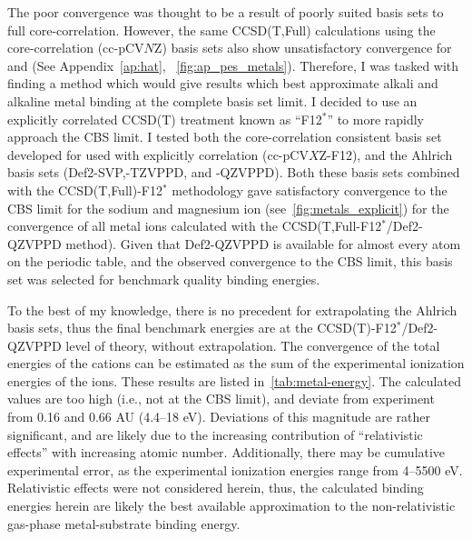 The poor convergence was thought to be a result of poorly suited basis sets to
full core-correlation. However, the same CCSD(T,Full) calculations using the
core-correlation (cc-pCV$N$Z) basis sets also show unsatisfactory convergence
for  and  (See Appendix~\ref{ap:hat},
~\ref{fig:ap_pes_metals}). Therefore, I was tasked with finding a method which
would give results which best approximate alkali and alkaline metal binding at
the complete basis set limit. I decided to use an explicitly correlated CCSD(T)
treatment known as ``F12$^*$'' to more rapidly approach the CBS
limit.\cite{Tenno2012} I tested both the core-correlation consistent basis set
developed for used with explicitly correlation
(cc-pCV$X$Z-F12),\cite{Peterson2008} and the Ahlrich basis sets
(Def2-SVP,-TZVPPD, and -QZVPPD).\cite{Rappoport2010} Both these basis sets
combined with the CCSD(T,Full)-F12$^*$ methodology gave satisfactory
convergence to the CBS limit for the sodium and magnesium ion
(see~\ref{fig:metals_explicit}) for the convergence of all metal ions
calculated with the CCSD(T,Full-F12$^*$/Def2-QZVPPD method). Given that
Def2-QZVPPD is available for almost every atom on the periodic table, and the
observed convergence to the CBS limit, this basis set was selected for
benchmark quality binding energies.

To the best of my knowledge, there is no precedent for extrapolating the
Ahlrich basis sets, thus the final benchmark energies are at the
CCSD(T)-F12$^*$/Def2-QZVPPD level of theory, without extrapolation. The
convergence of the total energies of the cations can be estimated as the sum of
the experimental ionization energies of the ions. These results are listed
in~\ref{tab:metal-energy}. The calculated values are too high (i.e., not at the
CBS limit), and deviate from experiment from 0.16 and 0.66 AU (4.4--18 eV).
Deviations of this magnitude are rather significant, and are likely due to the
increasing contribution of ``relativistic effects'' with increasing atomic
number. Additionally, there may be cumulative experimental error, as the
experimental ionization energies range from 4--5500 eV. Relativistic effects
were not considered herein, thus, the calculated binding energies herein are
likely the best available approximation to the non-relativistic gas-phase
metal-substrate binding energy.

